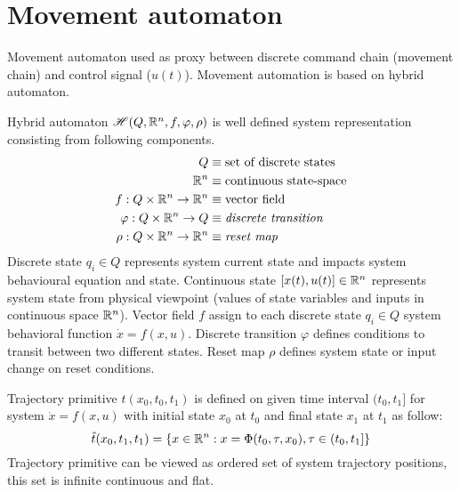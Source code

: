 \section{Movement automaton}
\noindent Movement automaton used as proxy between discrete command chain (movement chain) and control signal ($u(t)$). Movement automation is based on hybrid automaton.
\begin{definition} {Hybrid automaton $\mathscr{H}(Q,\mathbb{R}^n,f,\varphi,\rho)$} is well defined system representation consisting from following components.
\begin{equation}
    \begin{aligned}
        Q &\equiv \textnormal{set of discrete states}\\
        \mathbb{R}^n &\equiv \textnormal{continuous state-space} \\
        f: Q\times \mathbb{R}^n \to \mathbb{R}^n & \equiv \textnormal{vector field}\\
        \varphi:Q\times \mathbb{R}^n \to Q & \equiv \textit{discrete transition}\\
        \rho : Q\times \mathbb{R}^n \to \mathbb{R}^n & \equiv\textit{reset map}\\
    \end{aligned}
\end{equation}
Discrete state $q_i \in Q$ represents system current state and impacts system behavioural equation and state. Continuous state $[x(t),u(t)]\in \mathbb{R}^n$ represents  system state from physical viewpoint (values of state variables and inputs in continuous space $\mathbb{R}^n$). Vector field $f$ assign to each discrete state $q_i \in Q$ system behavioral function $\dot{x} = f(x,u)$. Discrete transition $\varphi$ defines conditions to transit between two different states. Reset map $\rho$ defines system state or input change on reset conditions.
\end{definition} 

\begin{definition}{Trajectory primitive $\hat{t}(x_0,t_0,t_1)$} is defined on given time interval $(t_0,t_1]$ for system $\dot{x} = f(x,u)$ with initial state $x_0$ at $t_0$ and final state $x_1$ at $t_1$ as follow:
\begin{equation}
    \hat{t}(x_0,t_1,t_1) = \left\{ x\in\mathbb{R}^n: x = \Phi(t_0,\tau,x_0), \tau \in (t_0,t_1] \right\}
\end{equation}
Trajectory primitive can be viewed as ordered set of system trajectory positions, this set is infinite continuous and flat.    
\end{definition}

